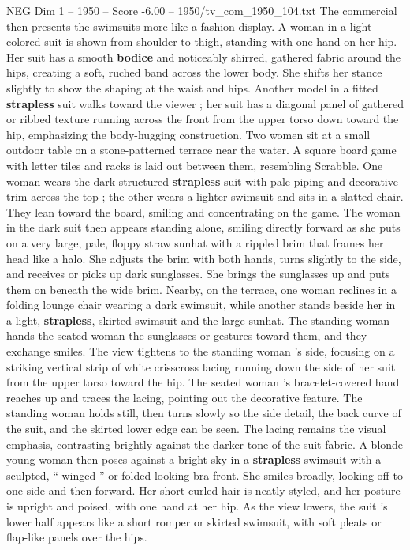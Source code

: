\begin{textsample}{NEG Dim 1 – 1950 – Score -6.00 – 1950/tv\_com\_1950\_104.txt}
The commercial then presents the swimsuits more like a fashion display.
A woman in a light-colored suit is shown from shoulder to thigh, standing with one hand on her hip.
Her suit has a smooth \textbf{bodice} and noticeably shirred, gathered fabric around the hips, creating a soft, ruched band across the lower body.
She shifts her stance slightly to show the shaping at the waist and hips.
Another model in a fitted \textbf{strapless} suit walks toward the viewer ; her suit has a diagonal panel of gathered or ribbed texture running across the front from the upper torso down toward the hip, emphasizing the body-hugging construction.
Two women sit at a small outdoor table on a stone-patterned terrace near the water.
A square board game with letter tiles and racks is laid out between them, resembling Scrabble.
One woman wears the dark structured \textbf{strapless} suit with pale piping and decorative trim across the top ; the other wears a lighter swimsuit and sits in a slatted chair.
They lean toward the board, smiling and concentrating on the game.
The woman in the dark suit then appears standing alone, smiling directly forward as she puts on a very large, pale, floppy straw sunhat with a rippled brim that frames her head like a halo.
She adjusts the brim with both hands, turns slightly to the side, and receives or picks up dark sunglasses.
She brings the sunglasses up and puts them on beneath the wide brim.
Nearby, on the terrace, one woman reclines in a folding lounge chair wearing a dark swimsuit, while another stands beside her in a light, \textbf{strapless}, skirted swimsuit and the large sunhat.
The standing woman hands the seated woman the sunglasses or gestures toward them, and they exchange smiles.
The view tightens to the standing woman ’s side, focusing on a striking vertical strip of white crisscross lacing running down the side of her suit from the upper torso toward the hip.
The seated woman ’s bracelet-covered hand reaches up and traces the lacing, pointing out the decorative feature.
The standing woman holds still, then turns slowly so the side detail, the back curve of the suit, and the skirted lower edge can be seen.
The lacing remains the visual emphasis, contrasting brightly against the darker tone of the suit fabric.
A blonde young woman then poses against a bright sky in a \textbf{strapless} swimsuit with a sculpted, “ winged ” or folded-looking bra front.
She smiles broadly, looking off to one side and then forward.
Her short curled hair is neatly styled, and her posture is upright and poised, with one hand at her hip.
As the view lowers, the suit ’s lower half appears like a short romper or skirted swimsuit, with soft pleats or flap-like panels over the hips.

\end{textsample}
